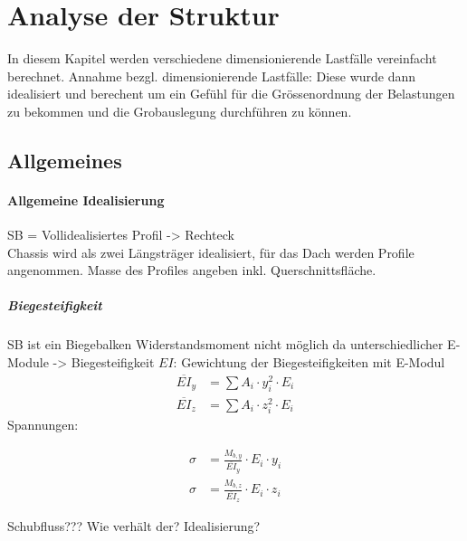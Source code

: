 \section{Analyse der Struktur}
In diesem Kapitel werden verschiedene dimensionierende Lastfälle vereinfacht berechnet.
Annahme bezgl. dimensionierende Lastfälle:
Diese wurde dann idealisiert und berechent um ein Gefühl für die Grössenordnung der Belastungen zu bekommen und die Grobauslegung durchführen zu können.

\subsection{Allgemeines}

\paragraph{Allgemeine Idealisierung}
SB = Vollidealisiertes Profil -> Rechteck\\
Chassis wird als zwei Längsträger idealisiert, für das Dach werden Profile angenommen. Masse des Profiles angeben inkl. Querschnittsfläche.

\subparagraph{Biegesteifigkeit}
SB ist ein Biegebalken
Widerstandsmoment nicht möglich da unterschiedlicher E-Module -> Biegesteifigkeit $EI$: Gewichtung der Biegesteifigkeiten mit E-Modul
\begin{equation}
  \label{eq:1}
  \begin{split}
    \overline{EI}_y &= \sum A_i \cdot y_i^2 \cdot E_i\\
    \overline{EI}_z &= \sum A_i \cdot z_i^2 \cdot E_i
  \end{split}
\end{equation}
Spannungen:

\begin{equation}
  \label{eq:2}
  \begin{split}
    \sigma &= \frac{M_{b,y}}{\overline{EI}_y}\cdot E_i \cdot y_i\\
    \sigma &= \frac{M_{b,z}}{\overline{EI}_z}\cdot E_i \cdot z_i
  \end{split}
\end{equation}

Schubfluss??? Wie verhält der? Idealisierung?

